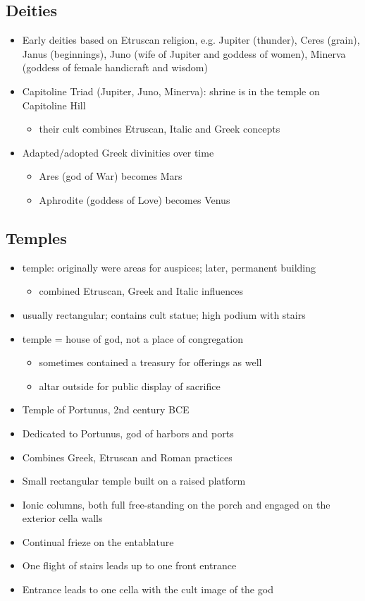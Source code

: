\documentclass[12pt, twoside]{article}
\begin{document}
\subsection{Deities}
\begin{itemize}
\item Early deities based on Etruscan religion, e.g. Jupiter (thunder), Ceres (grain), Janus (beginnings), Juno (wife of Jupiter and goddess of women), Minerva (goddess of female handicraft and wisdom)
\item Capitoline Triad (Jupiter, Juno, Minerva): shrine is in the temple on Capitoline Hill
	\begin{itemize}
	\item their cult combines Etruscan, Italic and Greek concepts
	\end{itemize}
\item Adapted/adopted Greek divinities over time
	\begin{itemize}
	\item Ares (god of War) becomes Mars
	\item Aphrodite (goddess of Love) becomes Venus
	\end{itemize}
\end{itemize}

\subsection{Temples}
\begin{itemize}
\item temple: originally were areas for auspices; later, permanent building
	\begin{itemize}
	\item combined Etruscan, Greek and Italic influences
	\end{itemize}
\item usually rectangular; contains cult statue; high podium with stairs
\item temple = house of god, not a place of congregation
	\begin{itemize}
	\item sometimes contained a treasury for offerings as well
	\item altar outside for public display of sacrifice
	\end{itemize}
\item Temple of Portunus,  2nd century BCE
\item Dedicated to Portunus, god of harbors and ports
\item Combines Greek, Etruscan and Roman practices
\item Small rectangular temple built on a raised platform
\item Ionic columns, both full free-standing on the porch and engaged on the exterior cella walls
\item Continual frieze on the entablature
\item One flight of stairs leads up to one front entrance
\item Entrance leads to one cella with the cult image of the god
\end{itemize}
\end{document}
